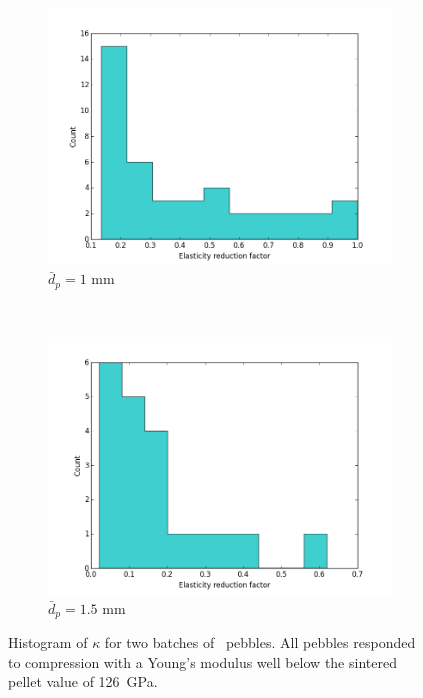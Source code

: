\begin{figure}
        \centering
        \begin{subfigure}[b]{\doubleimagewidth}
                \includegraphics[width=\textwidth]{chapters/figures/nfri-1mm-kappa-histogram.png}
                \caption{$\bar{d}_p = 1$ mm}
                \label{fig:nfri-1mm-kappa-hist}
        \end{subfigure}
        ~
        \begin{subfigure}[b]{\doubleimagewidth}
                \includegraphics[width=\textwidth]{chapters/figures/nfri-1.5mm-kappa-histogram.png}
                \caption{$\bar{d}_p = 1.5$ mm}
                \label{fig:nfri-1.5mm-kappa-hist}
        \end{subfigure}
        \caption{Histogram of $\kappa$ for two batches of \lit~pebbles. All pebbles responded to compression with a Young's modulus well below the sintered pellet value of \si{126 GPa}.}\label{fig:nfri-kappa-hist}
\end{figure}


